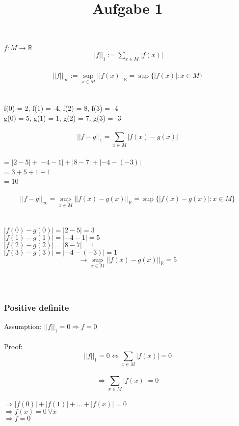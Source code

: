 \documentclass{article}
\title{Aufgabe 1}
\date{}
\begin{document}
\maketitle

\section{}
\subsection{}
$f: M \rightarrow \mathbb{R}$\\
\noindent
\begin{align*}
||f||_1 := \sum_{x \in M}{|f(x)|}
\end{align*}\\
\[||f||_\infty := \sup_{x \in M} ||f(x)||_\mathbb{R} = \sup \{|f(x)| : x \in M\}\]\\
\\
f(0) = 2, f(1) = -4, f(2) = 8, f(3) = -4\\
g(0) = 5, g(1) = 1, g(2) = 7, g(3) = -3\\
\\
\[||f-g||_1 = \sum_{x \in M}{|f(x) - g(x)|}\]\\
= $| 2-5| + |-4 -1| + |8-7| + |-4 - (-3)|$\\
= $ 3 + 5 + 1 + 1$\\
= 10\\
\\
\[||f-g||_\infty = \sup_{x \in M} ||f(x) - g(x)||_\mathbb{R} = \sup \{|f(x) - g(x)| : x\in M\}\]\\
\\
$|f(0) - g(0)| = |2 - 5| = 3$\\
$|f(1) - g(1)| = |-4 - 1| = 5$\\
$|f(2) - g(2)| = |8 - 7| = 1$ \\
$|f(3) - g(3)| = |-4 - (-3)| = 1$\\
\[\rightarrow \sup_{x \in M} ||f(x) - g(x)||_\mathbb{R} = 5\]\\
\\
\subsection{}
\subsubsection{Positive definite}
Assumption: $||f||_1 = 0 \Rightarrow f = 0$\\
\\
Proof:\\
\[||f||_1 =  0 \Leftrightarrow \sum_{x \in M}{|f(x)|} = 0\] \\
\[ \Rightarrow \sum_{x \in M} {|f(x)|} = 0\] \\
$ \Rightarrow| f(0)| + |f(1)| + ... + |f(x)| = 0$ \\
$ \Rightarrow f(x) = 0~\forall x$ \\
$\Rightarrow f = 0$
\end{document}
